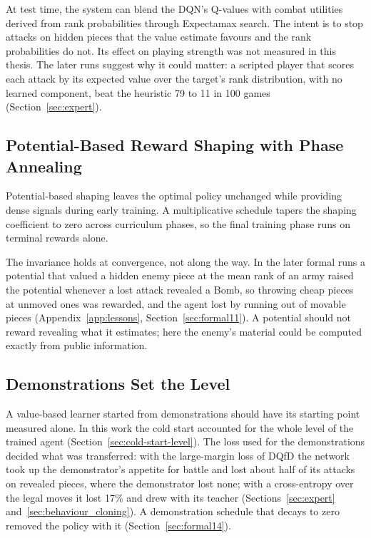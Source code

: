 At test time, the system can blend the DQN's Q-values with combat utilities derived from rank probabilities through Expectamax search. The intent is to stop attacks on hidden pieces that the value estimate favours and the rank probabilities do not. Its effect on playing strength was not measured in this thesis. The later runs suggest why it could matter: a scripted player that scores each attack by its expected value over the target's rank distribution, with no learned component, beat the heuristic 79 to 11 in 100 games (Section~\ref{sec:expert}).

\subsection{Potential-Based Reward Shaping with Phase Annealing}

Potential-based shaping leaves the optimal policy unchanged \cite{NgPBRS} while providing dense signals during early training. A multiplicative schedule tapers the shaping coefficient to zero across curriculum phases, so the final training phase runs on terminal rewards alone.

The invariance holds at convergence, not along the way. In the later formal runs a potential that valued a hidden enemy piece at the mean rank of an army raised the potential whenever a lost attack revealed a Bomb, so throwing cheap pieces at unmoved ones was rewarded, and the agent lost by running out of movable pieces (Appendix~\ref{app:lessons}, Section~\ref{sec:formal11}). A potential should not reward revealing what it estimates; here the enemy's material could be computed exactly from public information.

\subsection{Demonstrations Set the Level}

A value-based learner started from demonstrations should have its starting point measured alone. In this work the cold start accounted for the whole level of the trained agent (Section~\ref{sec:cold-start-level}). The loss used for the demonstrations decided what was transferred: with the large-margin loss of DQfD \cite{DQfD} the network took up the demonstrator's appetite for battle and lost about half of its attacks on revealed pieces, where the demonstrator lost none; with a cross-entropy over the legal moves it lost 17\% and drew with its teacher (Sections~\ref{sec:expert} and~\ref{sec:behaviour_cloning}). A demonstration schedule that decays to zero removed the policy with it (Section~\ref{sec:formal14}).

